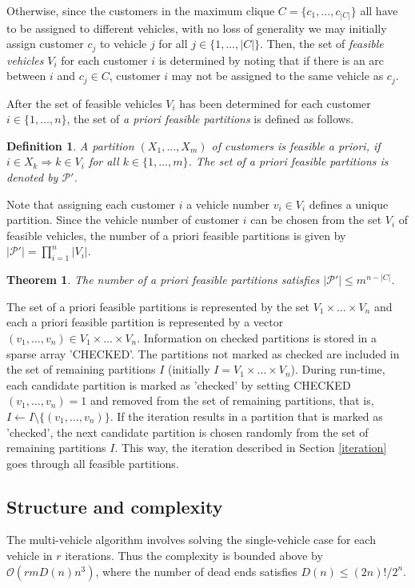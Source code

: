 \documentclass[dissertation,draft*]{aaltoseries}
\newtheorem{theorem}{Theorem}
\newtheorem*{definition}{Definition}
\begin{document}
Otherwise, since the customers in the maximum clique $C = \{c_1,\ldots,c_{|C|}\}$ all have to be assigned to different vehicles, 
with no loss of generality we may initially assign customer $c_j$ to vehicle $j$ for all $j \in \{1,\ldots,|C|\}$.
Then, the set of \emph{feasible vehicles} $V_i$ for each customer $i$ is determined by noting that if there is an 
arc between $i$ and $c_j \in C$, customer $i$ may not be assigned to the same vehicle as $c_j$.

After the set of feasible vehicles $V_i$ has been determined for each customer $i \in \{1,\ldots,n\}$,
the set of \emph{a priori feasible partitions} is defined as follows.
\begin{definition}
A partition $(X_1,\ldots,X_m)$ of customers is feasible a priori, if $i \in X_k \Rightarrow k \in V_i$ for all $k \in \{1,\ldots,m\}$.
The set of a priori feasible partitions is denoted by $\mathcal{P}'$.
\end{definition}
Note that assigning each customer $i$ a vehicle number $v_i \in V_i$ defines a unique partition.
Since the vehicle number of customer $i$ can be chosen from the set $V_i$ of feasible vehicles, 
the number of a priori feasible partitions is given by $|\mathcal{P}'| = \prod_{i=1}^n |V_i|$.

\begin{theorem}
\label{partitions}
The number of a priori feasible partitions satisfies $|\mathcal{P}'| \leq m^{n-|C|}$.
\end{theorem}

The set of a priori feasible partitions is represented by the set $V_1 \times \ldots \times V_n$ and each a 
priori feasible partition is represented by a vector $(v_1,\ldots,v_n) \in V_1 \times \ldots \times V_n$.
Information on checked partitions is stored in a sparse array 'CHECKED'.
The partitions not marked as checked are included in the set of remaining partitions $I$
(initially $I = V_1 \times \ldots \times V_n$).
During run-time, each candidate partition is marked as 'checked' by setting CHECKED$(v_1,\ldots,v_n) = 1$ and
removed from the set of remaining partitions, that is, $I \leftarrow I \setminus \{(v_1,\ldots,v_n)\}$.
If the iteration results in a partition that is marked as 'checked', the 
next candidate partition is chosen randomly from the set of remaining partitions $I$.
This way, the iteration described in Section \ref{iteration} goes through all feasible partitions.



\subsection{Structure and complexity}
\label{mvstructure}
The multi-vehicle algorithm involves solving the single-vehicle case
for each vehicle in $r$ iterations. Thus the complexity is bounded above by $\mathcal{O}\left(rmD(n)n^3\right)$, 
where the number of dead ends satisfies $D(n) \leq (2n)!/2^n$.                                                                                                                  
\end{document}

